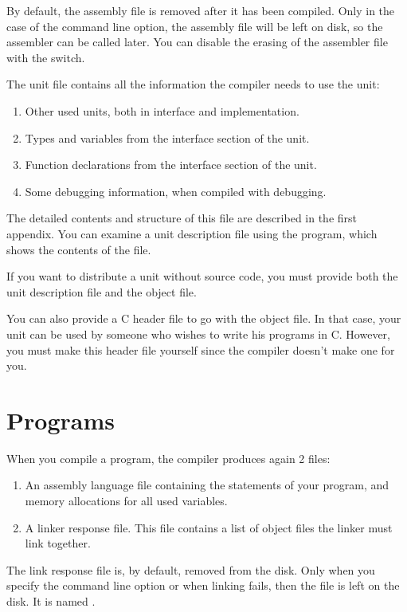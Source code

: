 By default, the assembly file is removed after it has been compiled.
Only in the case of the  command line option, the assembly file
will be left on disk, so the assembler can be called later. You can
disable the erasing of the assembler file with the  switch.

The unit file contains all the information the compiler needs to use the
unit:
\begin{enumerate}
\item Other used units, both in interface and implementation.
\item Types and variables from the interface section of the unit.
\item Function declarations from the interface section of the unit.
\item Some debugging information, when compiled with debugging.
\end{enumerate}

The detailed contents and structure of this file are described in the first
appendix. You can examine a unit description file using the 
program, which shows the contents of the file.

If you want to distribute a unit without source code, you must provide both
the unit description file and the object file.

You can also provide a C header file to go with the object file. In that
case, your unit can be used by someone who wishes to write his programs in
C. However, you must make this header file yourself since the \fpc compiler
doesn't make one for you.

\section{Programs}
\label{se:Programs}

When you compile a program, the compiler produces again 2 files:
\begin{enumerate}
\item An assembly language file containing the statements of your program,
and memory allocations for all used variables.
\item A linker response file. This file contains a list of object files the
linker must link together.
\end{enumerate}
The link response file is, by default, removed from the disk. Only when you
specify the  command line option or when linking fails, then the file
is left on the disk. It is named .

